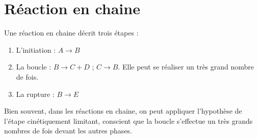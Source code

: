 \section{Réaction en chaine}
Une réaction en chaine décrit trois étapes :
\begin{enumerate}[1-]
 \item L'initiation : $A \rightarrow B$
 \item La boucle : $B \rightarrow C + D$ ; $C \rightarrow B$. Elle peut se réaliser un très grand nombre de fois.
 \item La rupture : $B \rightarrow E$
\end{enumerate}
Bien souvent, dans les réactions en chaine, on peut appliquer l'hypothèse de l'étape cinétiquement limitant, conscient que la boucle s'effectue un très grands nombres de fois devant les autres phases.